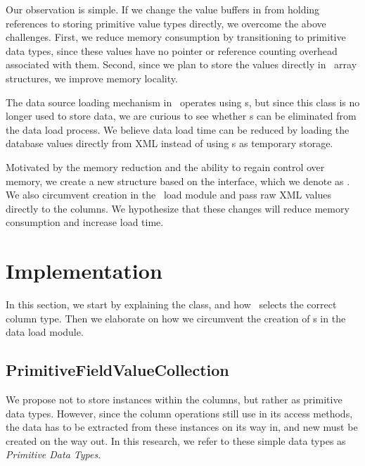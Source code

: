 Our observation is simple. If we change the value buffers in  from holding  references to storing primitive value types directly, we overcome the above challenges. First, we reduce memory consumption by transitioning to primitive data types, since these values have no pointer or reference counting overhead associated with them. Second, since we plan to store the values directly in \delphi~array structures, we improve memory locality.

The data source loading mechanism in \gap~operates using s, but since this class is no longer used to store data, we are curious to see whether s can be eliminated from the data load process. We believe data load time can be reduced by loading the database values directly from XML instead of using s as temporary storage.


Motivated by the memory reduction and the ability to regain control over memory, we create a new structure based on the  interface, which we denote as . We also circumvent  creation in the \gap~load module and pass raw XML values directly to the columns. We hypothesize that these changes will reduce memory consumption and increase load time.
\section{Implementation}
\label{sec:Implementation}
In this section, we start by explaining the  class, and how \gap~selects the correct column type. Then we elaborate on how we circumvent the creation of s in the data load module.

\subsection{PrimitiveFieldValueCollection}
\label{sub:PrimitiveFieldValueCollection}
We propose not to store  instances within the columns, but rather as primitive data types. However, since the column operations still use  in its access methods, the data has to be extracted from these instances on its way in, and new  must be created on the way out. In this research, we refer to these simple data types as \textit{Primitive Data Types}. 


